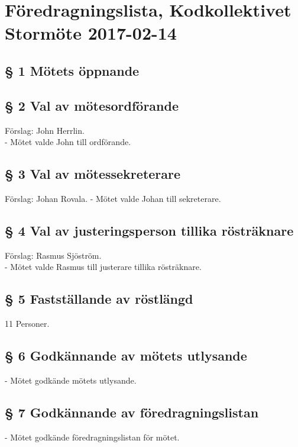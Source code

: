 \documentclass[11pt,swedish]{article}
\begin{document}
\section{\large Föredragningslista, Kodkollektivet Stormöte 2017-02-14}

\subsection{§ 1 \hspace{10mm} Mötets öppnande}

\subsection{§ 2 \hspace{10mm} Val av mötesordförande}
		Förslag: John Herrlin. \\
		\noindent - Mötet valde John till ordförande.

\subsection{§ 3 \hspace{10mm} Val av mötessekreterare}
		Förslag: Johan Rovala.
		\noindent - Mötet valde Johan till sekreterare.

\subsection{§ 4 \hspace{10mm} Val av justeringsperson tillika rösträknare}
		Förslag: Rasmus Sjöström. \\
		\noindent - Mötet valde Rasmus till justerare tillika rösträknare.

\subsection{§ 5 \hspace{10mm} Fastställande av röstlängd}
		11 Personer.

\subsection{§ 6 \hspace{10mm} Godkännande av mötets utlysande}
	- Mötet godkände mötets utlysande.
	
\subsection{§ 7 \hspace{10mm} Godkännande av föredragningslistan}
	- Mötet godkände föredragningslistan för mötet.
	
\end{document}
